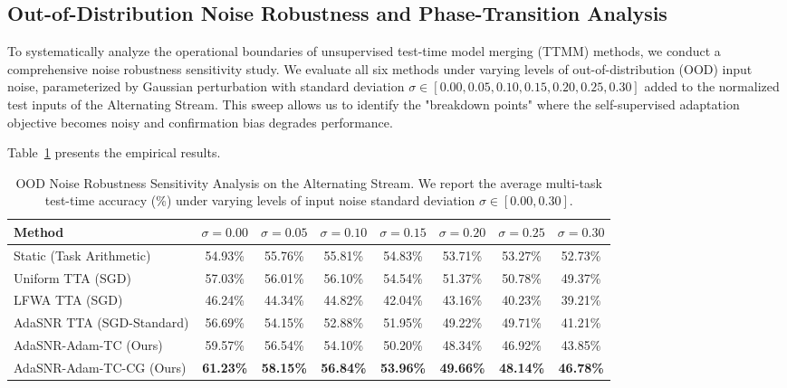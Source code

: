 \documentclass{article}
\theoremstyle{plain}
\theoremstyle{definition}
\theoremstyle{remark}
\begin{document}
\subsection{Out-of-Distribution Noise Robustness and Phase-Transition Analysis}
To systematically analyze the operational boundaries of unsupervised test-time model merging (TTMM) methods, we conduct a comprehensive noise robustness sensitivity study. We evaluate all six methods under varying levels of out-of-distribution (OOD) input noise, parameterized by Gaussian perturbation with standard deviation $\sigma \in [0.00, 0.05, 0.10, 0.15, 0.20, 0.25, 0.30]$ added to the normalized test inputs of the Alternating Stream. This sweep allows us to identify the "breakdown points" where the self-supervised adaptation objective becomes noisy and confirmation bias degrades performance.

Table~\ref{tab:noise_robustness} presents the empirical results.

\begin{table}[t]
\caption{OOD Noise Robustness Sensitivity Analysis on the Alternating Stream. We report the average multi-task test-time accuracy (\%) under varying levels of input noise standard deviation $\sigma \in [0.00, 0.30]$.}
\label{tab:noise_robustness}
\vskip 0.15in
\begin{center}
\begin{small}
\begin{tabular}{lccccccc}
\toprule
\textbf{Method} & \textbf{$\sigma=0.00$} & \textbf{$\sigma=0.05$} & \textbf{$\sigma=0.10$} & \textbf{$\sigma=0.15$} & \textbf{$\sigma=0.20$} & \textbf{$\sigma=0.25$} & \textbf{$\sigma=0.30$} \\
\midrule
Static (Task Arithmetic)     & 54.93\% & 55.76\% & 55.81\% & 54.83\% & 53.71\% & 53.27\% & 52.73\% \\
Uniform TTA (SGD)            & 57.03\% & 56.01\% & 56.10\% & 54.54\% & 51.37\% & 50.78\% & 49.37\% \\
LFWA TTA (SGD)               & 46.24\% & 44.34\% & 44.82\% & 42.04\% & 43.16\% & 40.23\% & 39.21\% \\
AdaSNR TTA (SGD-Standard)    & 56.69\% & 54.15\% & 52.88\% & 51.95\% & 49.22\% & 49.71\% & 41.21\% \\
AdaSNR-Adam-TC (Ours)        & 59.57\% & 56.54\% & 54.10\% & 50.20\% & 48.34\% & 46.92\% & 43.85\% \\
AdaSNR-Adam-TC-CG (Ours)     & \textbf{61.23\%} & \textbf{58.15\%} & \textbf{56.84\%} & \textbf{53.96\%} & \textbf{49.66\%} & \textbf{48.14\%} & \textbf{46.78\%} \\
\bottomrule
\end{tabular}
\end{small}
\end{center}
\vskip -0.1in
\end{table}
\end{document}
